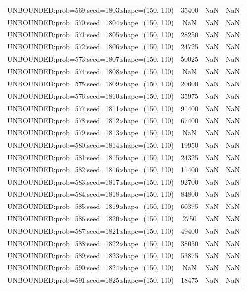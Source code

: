 \begin{longtable}{lccc}
UNBOUNDED:prob=569:seed=1803:shape=(150, 100) & 35400 &   NaN &    NaN \\
UNBOUNDED:prob=570:seed=1804:shape=(150, 100) &   NaN &   NaN &    NaN \\
UNBOUNDED:prob=571:seed=1805:shape=(150, 100) & 28250 &   NaN &    NaN \\
UNBOUNDED:prob=572:seed=1806:shape=(150, 100) & 24725 &   NaN &    NaN \\
UNBOUNDED:prob=573:seed=1807:shape=(150, 100) & 50025 &   NaN &    NaN \\
UNBOUNDED:prob=574:seed=1808:shape=(150, 100) &   NaN &   NaN &    NaN \\
UNBOUNDED:prob=575:seed=1809:shape=(150, 100) & 20600 &   NaN &    NaN \\
UNBOUNDED:prob=576:seed=1810:shape=(150, 100) & 35975 &   NaN &    NaN \\
UNBOUNDED:prob=577:seed=1811:shape=(150, 100) & 91400 &   NaN &    NaN \\
UNBOUNDED:prob=578:seed=1812:shape=(150, 100) & 67400 &   NaN &    NaN \\
UNBOUNDED:prob=579:seed=1813:shape=(150, 100) &   NaN &   NaN &    NaN \\
UNBOUNDED:prob=580:seed=1814:shape=(150, 100) & 19950 &   NaN &    NaN \\
UNBOUNDED:prob=581:seed=1815:shape=(150, 100) & 24325 &   NaN &    NaN \\
UNBOUNDED:prob=582:seed=1816:shape=(150, 100) & 11400 &   NaN &    NaN \\
UNBOUNDED:prob=583:seed=1817:shape=(150, 100) & 92700 &   NaN &    NaN \\
UNBOUNDED:prob=584:seed=1818:shape=(150, 100) & 84800 &   NaN &    NaN \\
UNBOUNDED:prob=585:seed=1819:shape=(150, 100) & 60375 &   NaN &    NaN \\
UNBOUNDED:prob=586:seed=1820:shape=(150, 100) &  2750 &   NaN &    NaN \\
UNBOUNDED:prob=587:seed=1821:shape=(150, 100) & 49400 &   NaN &    NaN \\
UNBOUNDED:prob=588:seed=1822:shape=(150, 100) & 38050 &   NaN &    NaN \\
UNBOUNDED:prob=589:seed=1823:shape=(150, 100) & 53875 &   NaN &    NaN \\
UNBOUNDED:prob=590:seed=1824:shape=(150, 100) &   NaN &   NaN &    NaN \\
UNBOUNDED:prob=591:seed=1825:shape=(150, 100) & 18475 &   NaN &    NaN \\

\end{longtable}
